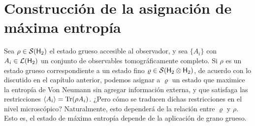 \section{Construcción de la asignación de máxima entropía}

Sea $\rho\in\mathcal{S}({\sf H}_{2})$ el estado grueso accesible al observador, y sea $\{A_{i}\}$ con $A_{i}\in\mathcal{L}({\sf H}_{2})$ un conjunto de observables tomográficamente completo. Si $\rho$ es un estado grueso correspondiente a un estado fino $\varrho\in\mathcal{S}({\sf H}_{2}\otimes{\sf H}_{2})$, de acuerdo con lo discutido en el capítulo anterior, podemos asignar a $\varrho$ un estado que maximice la entropía de Von Neumann sin agregar información externa, y que satisfaga las restricciones $\expval{A_{i}}=\Tr(\rho A_{i})$. ¿Pero cómo se traducen dichas restricciones en el nivel microscópico? Naturalmente, esto dependerá de la relación entre $\varrho$ y $\rho$. Esto es, el estado de máxima entropía depende de la aplicación de grano grueso.


